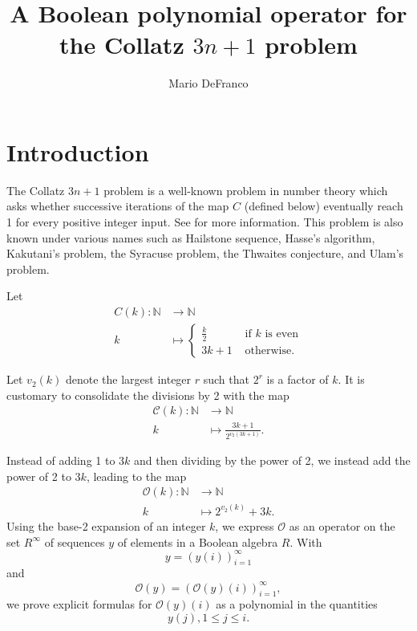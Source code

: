 \documentclass[11pt, oneside]{article}   	%
\begin{document}
\title{A Boolean polynomial operator for the Collatz $3n+1$ problem}
\author{Mario DeFranco}
\maketitle



\section{Introduction}
The Collatz $3n+1$ problem is a well-known problem in number theory which asks whether successive iterations of the map $C$ (defined below) eventually reach 1 for every positive integer input. See \cite{Lagarias} for more information. This problem is also known under various names such as Hailstone sequence, Hasse's algorithm, Kakutani's problem, the Syracuse problem, the Thwaites conjecture, and Ulam's problem.  

Let 
\begin{align*}
C(k) \colon \mathbb{N} & \rightarrow \mathbb{N} \\ 
k &\mapsto \begin{cases}
\frac{k}{2} &\text{ if $k$ is even} \\ 
3k+1 &\text{ otherwise}.   
\end{cases}
\end{align*}

Let $v_2(k)$ denote the largest integer $r$ such that $2^r$ is a factor of $k$. It is customary to consolidate the divisions by 2 with the map
\begin{align*}
\mathscr{C}(k) \colon \mathbb{N} & \rightarrow \mathbb{N} \\ 
k &\mapsto \frac{3k+1}{2^{v_2(3k+1)}}.
\end{align*}

Instead of adding 1 to $3k$ and then dividing by the power of 2, we instead add the power of 2 to $3k$, leading to the map 
\begin{align*}
\mathscr{O}(k) \colon \mathbb{N} & \rightarrow \mathbb{N}\\ 
k &\mapsto 2^{v_2(k)}+ 3k.
\end{align*}
Using the base-2 expansion of an integer $k$, we express $\mathscr{O}$ as an operator on the set $R^\infty$ of sequences $y$ of elements in a Boolean algebra $R$. 
With 
\[
y = (y(i))_{i=1}^\infty
\]
and 
\[
\mathscr{O}(y) = (\mathscr{O}(y)(i))_{i=1}^\infty,
\]
we prove explicit formulas for $\mathscr{O}(y)(i)$ as a polynomial in the quantities
\[
y(j), 1 \leq j \leq i. 
\]
\end{document}
